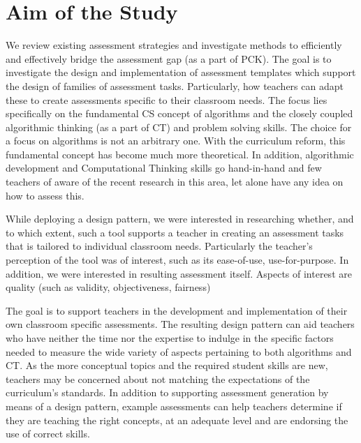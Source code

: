 \section{Aim of the Study}\label{sec:aim}


We review existing assessment strategies and investigate methods to efficiently and effectively bridge the assessment gap (as a part of PCK). The goal is to investigate the design and implementation of assessment templates which support the design of families of assessment tasks. Particularly, how teachers can adapt these to create assessments specific to their classroom needs. The focus lies specifically on the fundamental CS concept of algorithms and the closely coupled algorithmic thinking (as a part of CT) and problem solving skills. The choice for a focus on algorithms is not an arbitrary one. With the curriculum reform, this fundamental concept has become much more theoretical. In addition, algorithmic development and Computational Thinking skills go hand-in-hand and few teachers of aware of the recent research in this area, let alone have any idea on how to assess this.


While deploying a design pattern, we were interested in researching whether, and to which extent, such a tool supports a teacher in creating an assessment tasks that is tailored to individual classroom needs. Particularly the teacher’s perception of the tool was of interest, such as its ease-of-use, use-for-purpose. In addition, we were interested in resulting assessment itself. Aspects of interest are quality (such as validity, objectiveness, fairness)




The goal is to support teachers in the development and implementation of their own classroom specific assessments. The resulting design pattern can aid teachers who have neither the time nor the expertise to indulge in the specific factors needed to measure the wide variety of aspects pertaining to both algorithms and CT. As the more conceptual topics and the required student skills are new, teachers may be concerned about not matching the expectations of the curriculum's standards. In addition to supporting assessment generation by means of a design pattern, example assessments can help teachers determine if they are teaching the right concepts, at an adequate level and are endorsing the use of correct skills.

